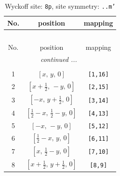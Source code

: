 \documentclass[fleqn,8pt]{jsarticle}
\begin{document}
\begin{longtable}{ccc}
\caption{Wyckoff site: {\tt 8p}, site symmetry: {\tt ..m'}}
 \\
 \hline \hline
No. & position & mapping \\ \hline \endfirsthead

\multicolumn{2}{l}{\tablename\ \thetable{}} \\
 \hline \hline
No. & position & mapping \\ \hline \endhead

 \hline \hline
\multicolumn{2}{r}{\footnotesize\it continued ...} \\ \endfoot

 \hline \hline
\multicolumn{2}{r}{} \\ \endlastfoot

1 & $\left[ x,\, y,\, 0 \right]$ & {\tt [1,16]} \\ \hline
2 & $\left[ x + \frac{1}{2},\, - y,\, 0 \right]$ & {\tt [2,15]} \\ \hline
3 & $\left[ - x,\, y + \frac{1}{2},\, 0 \right]$ & {\tt [3,14]} \\ \hline
4 & $\left[ \frac{1}{2} - x,\, \frac{1}{2} - y,\, 0 \right]$ & {\tt [4,13]} \\ \hline
5 & $\left[ - x,\, - y,\, 0 \right]$ & {\tt [5,12]} \\ \hline
6 & $\left[ \frac{1}{2} - x,\, y,\, 0 \right]$ & {\tt [6,11]} \\ \hline
7 & $\left[ x,\, \frac{1}{2} - y,\, 0 \right]$ & {\tt [7,10]} \\ \hline
8 & $\left[ x + \frac{1}{2},\, y + \frac{1}{2},\, 0 \right]$ & {\tt [8,9]} \\
\end{longtable}
\renewcommand{\arraystretch}{1.2}
\end{document}
